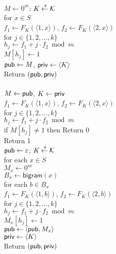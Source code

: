 \begin{figure}[tp]
\centering
{}
{
\\
$M \gets 0^m$; $K {\:\stackrel{{\scriptscriptstyle \hspace{0.2em}\$}} {\leftarrow}\:} {\cal K}$\\
for $x \in S$\\
\nudge $f_1 \gets F_{K}(\langle 1,x \rangle)$, $f_2 \gets F_{K}(\langle 2,x \rangle)$\\
\nudge for $j \in \{1,2,\ldots,k\}$\\
\nudge\nudge $h_j \gets f_1 + j\cdot f_2 \bmod m$\\
\nudge\nudge $M[h_j] \gets 1$\\
${\sf pub} \gets M$, ${\sf priv} \gets \langle K \rangle$\\
Return $({\sf pub},{\sf priv})$\\

\medskip
{}\\
$M\gets{\sf pub}$, $K \gets {\sf priv}$\\
$f_1 \gets F_{K}(\langle 1,x \rangle)$, $f_2 \gets F_{K}(\langle 2,x \rangle)$\\
for $j \in \{1,2,\ldots,k\}$\\
\nudge $h_j \gets f_1 + j\cdot f_2 \bmod m$\\
\nudge if $M[h_j] \neq 1$ then Return 0\\
Return 1
}
{
\\
${\sf pub} \gets \varepsilon$; $K {\:\stackrel{{\scriptscriptstyle \hspace{0.2em}\$}} {\leftarrow}\:} {\cal K}$\\
for each $x \in S$\\
\nudge $M_x \gets 0^m$\\
\nudge $B_x \gets \mathsf{bigram}(x)$\\
\nudge for each $b \in B_x$\\
\nudge\nudge $f_1 \gets F_{K}(\langle 1,b \rangle)$, $f_2 \gets F_{K}(\langle 2,b \rangle)$\\
\nudge\nudge for $j \in \{1, 2, \ldots, k\}$\\
\nudge\nudge\nudge $h_j \gets f_1+j\cdot f_2 \bmod m$\\
\nudge\nudge\nudge $M_x[h_j] \gets 1$\\
\nudge ${\sf pub} \gets \langle{\sf pub}, M_x \rangle$\\
${\sf priv} \gets \langle K \rangle$\\
Return $({\sf pub},{\sf priv})$\\

}
\end{figure}
